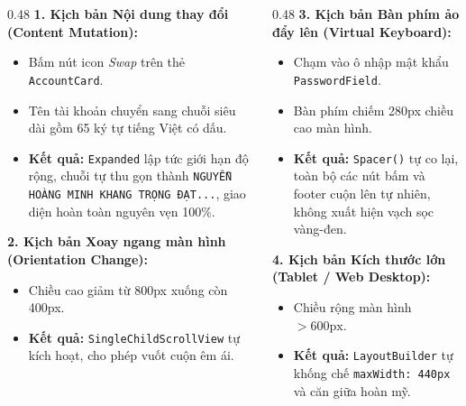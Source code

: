 \documentclass[aspectratio=169, 10pt]{beamer}
\newcommand{\SlideHeader}[2]{%
  \noindent{\textcolor{AccentOrange}{\textbf{\footnotesize #1}}}\\[0.08cm]
  \noindent{\Large \textbf{\textcolor{NavyTitle}{#2}}}\\[0.22cm]
}
\begin{document}
\begin{frame}
  \SlideHeader{KIỂM CHỨNG \& THỰC NGHIỆM}{Kiểm Thử Thực Tế Các Kịch Bản Thay Đổi Không Gian}

  \begin{columns}[T]
    \begin{column}{0.48\textwidth}
      \textbf{1. Kịch bản Nội dung thay đổi (Content Mutation):}
      \begin{itemize}
        \item Bấm nút icon \textit{Swap} trên thẻ \texttt{AccountCard}.
        \item Tên tài khoản chuyển sang chuỗi siêu dài gồm 65 ký tự tiếng Việt có dấu.
        \item \textbf{Kết quả:} \texttt{Expanded} lập tức giới hạn độ rộng, chuỗi tự thu gọn thành \texttt{NGUYỄN HOÀNG MINH KHANG TRỌNG ĐẠT...}, giao diện hoàn toàn nguyên vẹn 100\%.
      \end{itemize}

      \vspace{0.15cm}
      \textbf{2. Kịch bản Xoay ngang màn hình (Orientation Change):}
      \begin{itemize}
        \item Chiều cao giảm từ 800px xuống còn 400px.
        \item \textbf{Kết quả:} \texttt{SingleChildScrollView} tự kích hoạt, cho phép vuốt cuộn êm ái.
      \end{itemize}
    \end{column}

    \begin{column}{0.48\textwidth}
      \textbf{3. Kịch bản Bàn phím ảo đẩy lên (Virtual Keyboard):}
      \begin{itemize}
        \item Chạm vào ô nhập mật khẩu \texttt{PasswordField}.
        \item Bàn phím chiếm 280px chiều cao màn hình.
        \item \textbf{Kết quả:} \texttt{Spacer()} tự co lại, toàn bộ các nút bấm và footer cuộn lên tự nhiên, không xuất hiện vạch sọc vàng-đen.
      \end{itemize}

      \vspace{0.15cm}
      \textbf{4. Kịch bản Kích thước lớn (Tablet / Web Desktop):}
      \begin{itemize}
        \item Chiều rộng màn hình $> 600\text{px}$.
        \item \textbf{Kết quả:} \texttt{LayoutBuilder} tự khống chế \texttt{maxWidth: 440px} và căn giữa hoàn mỹ.
      \end{itemize}
    \end{column}
  \end{columns}
\end{frame}
\end{document}
